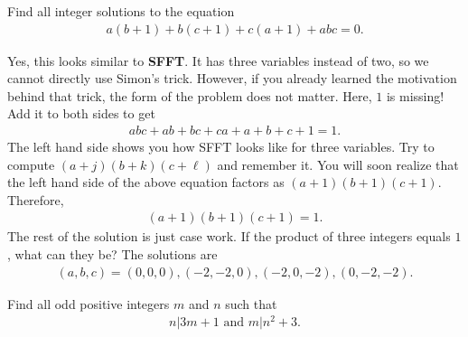\documentclass{subfile}
\begin{document}
	\begin{problem}
		Find all integer solutions to the equation
			\begin{align*}
				a(b+1)+b(c+1)+c(a+1)+abc=0.
			\end{align*}
	\end{problem}

	\begin{solution}
		Yes, this looks similar to \textbf{SFFT}. It has three variables instead of two, so we cannot directly use Simon's trick. However, if you already learned the motivation behind that trick, the form of the problem does not matter. Here, $1$ is missing! Add it to both sides to get
			\begin{align*}
				abc+ab+bc+ca+a+b+c+1=1.
			\end{align*}
		The left hand side shows you how SFFT looks like for three variables. Try to compute $(a+j)(b+k)(c+\ell)$ and remember it. You will soon realize that the left hand side of the above equation factors as $(a+1)(b+1)(c+1)$. Therefore,
			\begin{align*}
				(a+1)(b+1)(c+1)=1.
			\end{align*}
		The rest of the solution is just case work. If the product of three integers equals $1$, what can they be? The solutions are
			\begin{align*}
				(a,b,c)=(0,0,0), (-2,-2,0), (-2,0,-2), (0,-2,-2).
			\end{align*}
	\end{solution}

	\begin{problem}
		Find all odd positive integers $m$ and $n$ such that
			\begin{align*}
				n|3m+1 \mbox{ and } m|n^2+3.
			\end{align*}
	\end{problem}
\end{document}
